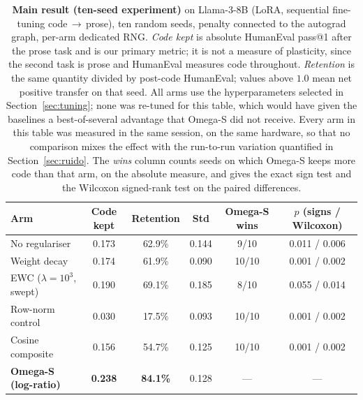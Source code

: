 \documentclass[11pt,a4paper]{article}
\begin{document}
\begin{table}[ht]
\centering
\caption{\textbf{Main result (ten-seed experiment)} on Llama-3-8B (LoRA,
sequential fine-tuning code$\,\to\,$prose), ten random seeds, penalty connected
to the autograd graph, per-arm dedicated RNG.
\emph{Code kept} is absolute HumanEval pass@1 after the prose task and is our
primary metric; it is not a measure of plasticity, since the second task is
prose and HumanEval measures code throughout.
\emph{Retention} is the same quantity divided by post-code HumanEval; values
above $1.0$ mean net positive transfer on that seed.
All arms use the hyperparameters selected in Section~\ref{sec:tuning}; none was
re-tuned for this table, which would have given the baselines a best-of-several
advantage that Omega-S did not receive.
Every arm in this table was measured in the same session, on the same hardware,
so that no comparison mixes the effect with the run-to-run variation quantified
in Section~\ref{sec:ruido}. The \emph{wins} column counts seeds on which
Omega-S keeps more code than that arm, on the absolute measure, and gives the
exact sign test and the Wilcoxon signed-rank test on the paired differences.}
\label{tab:main10}
\small
\begin{tabular}{lccccc}
\toprule
Arm & Code kept & Retention & Std & Omega-S wins & $p$ (signs / Wilcoxon) \\
\midrule
No regulariser & 0.173 & 62.9\% & 0.144 & 9/10 & 0.011 / 0.006 \\
Weight decay & 0.174 & 61.9\% & 0.090 & 10/10 & 0.001 / 0.002 \\
EWC ($\lambda{=}10^3$, swept) & 0.190 & 69.1\% & 0.185 & 8/10 & 0.055 / 0.014 \\
Row-norm control & 0.030 & 17.5\% & 0.093 & 10/10 & 0.001 / 0.002 \\
Cosine composite & 0.156 & 54.7\% & 0.125 & 10/10 & 0.001 / 0.002 \\
\textbf{Omega-S (log-ratio)} & \textbf{0.238} & \textbf{84.1\%} & 0.128 & --- & --- \\
\bottomrule
\end{tabular}
\end{table}
\end{document}
